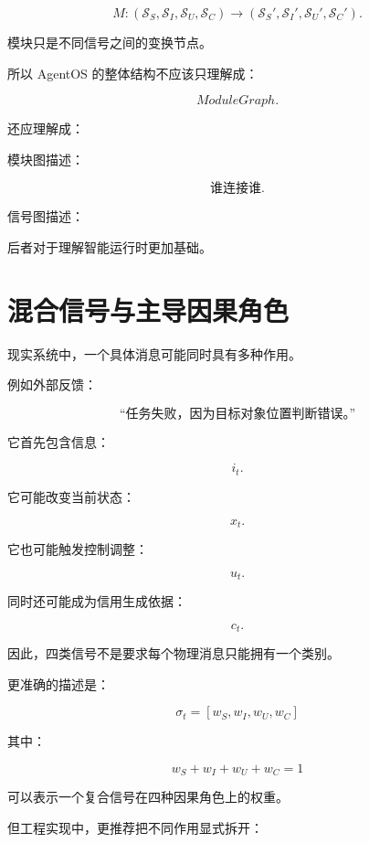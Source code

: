 \[
\boxed{
M:
(\mathcal S_S,
\mathcal S_I,
\mathcal S_U,
\mathcal S_C)
\rightarrow
(\mathcal S_S',
\mathcal S_I',
\mathcal S_U',
\mathcal S_C').
}
\]

模块只是不同信号之间的变换节点。

所以 AgentOS 的整体结构不应该只理解成：

\[
ModuleGraph.
\]

还应理解成：

\begin{statementbox}
\centering
{}
\end{statementbox}

模块图描述：

\[
\text{谁连接谁}.
\]

信号图描述：

\begin{statementbox}
\centering
{}
\end{statementbox}

后者对于理解智能运行时更加基础。

\section{混合信号与主导因果角色}

现实系统中，一个具体消息可能同时具有多种作用。

例如外部反馈：

\[
\text{“任务失败，因为目标对象位置判断错误。”}
\]

它首先包含信息：

\[
i_t.
\]

它可能改变当前状态：

\[
x_t.
\]

它也可能触发控制调整：

\[
u_t.
\]

同时还可能成为信用生成依据：

\[
c_t.
\]

因此，四类信号不是要求每个物理消息只能拥有一个类别。

更准确的描述是：

\[
\boxed{
\sigma_t
=
[
w_S,
w_I,
w_U,
w_C
]
}
\]

其中：

\[
w_S+w_I+w_U+w_C=1
\]

可以表示一个复合信号在四种因果角色上的权重。

但工程实现中，更推荐把不同作用显式拆开：

